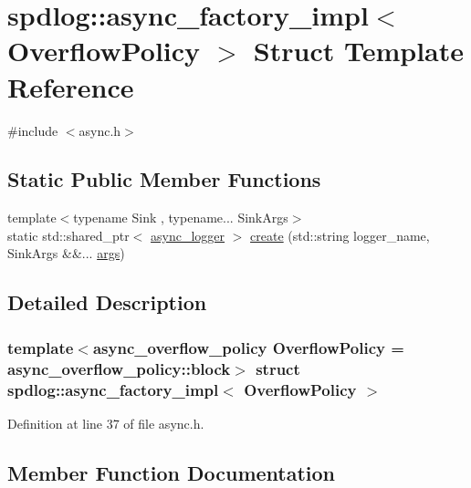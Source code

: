 \hypertarget{structspdlog_1_1async__factory__impl}{}\section{spdlog\+:\+:async\+\_\+factory\+\_\+impl$<$ Overflow\+Policy $>$ Struct Template Reference}
\label{structspdlog_1_1async__factory__impl}


{\ttfamily \#include $<$async.\+h$>$}

\subsection*{Static Public Member Functions}
\begin{DoxyCompactItemize}
\item 
{\footnotesize template$<$typename Sink , typename... Sink\+Args$>$ }\\static std\+::shared\+\_\+ptr$<$ \hyperlink{classspdlog_1_1async__logger}{async\+\_\+logger} $>$ \hyperlink{structspdlog_1_1async__factory__impl_aa39b4c4216d822e1788beccde29160d9}{create} (std\+::string logger\+\_\+name, Sink\+Args \&\&... \hyperlink{printf_8h_a47047b7b28fd1342eef756b79c778580}{args})
\end{DoxyCompactItemize}


\subsection{Detailed Description}
\subsubsection*{template$<$async\+\_\+overflow\+\_\+policy Overflow\+Policy = async\+\_\+overflow\+\_\+policy\+::block$>$\newline
struct spdlog\+::async\+\_\+factory\+\_\+impl$<$ Overflow\+Policy $>$}



Definition at line 37 of file async.\+h.



\subsection{Member Function Documentation}
\mbox{\label{structspdlog_1_1async__factory__impl_aa39b4c4216d822e1788beccde29160d9}} 

